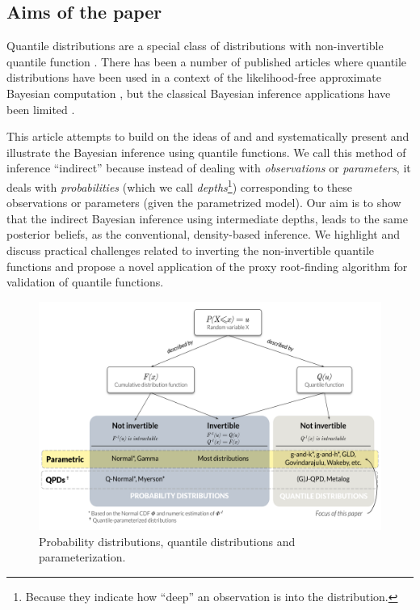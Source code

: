 \documentclass[
  12pt,
]{article}
\begin{document}
\hypertarget{aims-of-the-paper}{%
\subsection{Aims of the paper}\label{aims-of-the-paper}}

Quantile distributions are a special class of distributions with non-invertible quantile function \citep{gilchrist2000StatisticalModellingQuantile}. There has been a number of published articles where quantile distributions have been used in a context of the likelihood-free approximate Bayesian computation \citep{allingham2009BayesianEstimationQuantile, drovandi2011LikelihoodfreeBayesianEstimation, karabatsos2018ApproximateLikelihoodPerspective, fearnhead2012ConstructingSummaryStatistics, bernton2019ApproximateBayesianComputation, mcvinish2012ImprovingABCQuantile}, but the classical Bayesian inference applications have been limited \citep{haynes2005BayesianEstimationGandk, rayner2002NumericalMaximumLikelihood}.

This article attempts to build on the ideas of \citet{rayner2002NumericalMaximumLikelihood} and \citet{nair2020BayesianInferenceQuantile} and systematically present and illustrate the Bayesian inference using quantile functions. We call this method of inference ``indirect'' because instead of dealing with \emph{observations} or \emph{parameters}, it deals with \emph{probabilities} (which we call \emph{depths}\footnote{Because they indicate how ``deep'' an observation is into the distribution.}) corresponding to these observations or parameters (given the parametrized model). Our aim is to show that the indirect Bayesian inference using intermediate depths, leads to the same posterior beliefs, as the conventional, density-based inference. We highlight and discuss practical challenges related to inverting the non-invertible quantile functions and propose a novel application of the proxy root-finding algorithm for validation of quantile functions.

\begin{figure}

{\centering \includegraphics[width=6in]{img/QDs} 

}

\caption{Probability distributions, quantile distributions and parameterization.}\label{fig:qdist-chart}
\end{figure}
\end{document}
